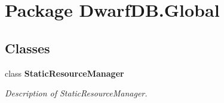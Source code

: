 \hypertarget{namespace_dwarf_d_b_1_1_global}{\section{Package Dwarf\+D\+B.\+Global}
\label{namespace_dwarf_d_b_1_1_global}
}
\subsection*{Classes}
\begin{DoxyCompactItemize}
\item 
class {\bfseries Static\+Resource\+Manager}
\begin{DoxyCompactList}\small\item\em Description of Static\+Resource\+Manager. \end{DoxyCompactList}\end{DoxyCompactItemize}
